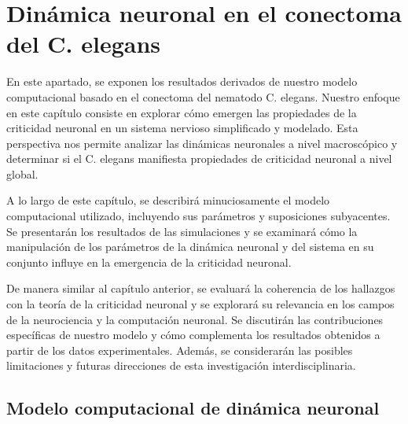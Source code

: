 \chapter{Dinámica neuronal en el conectoma del C. elegans}\label{cap:resultado_critico_modelo}
\graphicspath{{figs/capitulo_resultado_critico/}}


En este apartado, se exponen los resultados derivados de nuestro modelo computacional basado en el conectoma del nematodo C. elegans. Nuestro enfoque en este capítulo consiste en explorar cómo emergen las propiedades de la criticidad neuronal en un sistema nervioso simplificado y modelado. Esta perspectiva nos permite analizar las dinámicas neuronales a nivel macroscópico y determinar si el C. elegans manifiesta propiedades de criticidad neuronal a nivel global.

A lo largo de este capítulo, se describirá minuciosamente el modelo computacional utilizado, incluyendo sus parámetros y suposiciones subyacentes. Se presentarán los resultados de las simulaciones y se examinará cómo la manipulación de los parámetros de la dinámica neuronal y del sistema en su conjunto influye en la emergencia de la criticidad neuronal.

De manera similar al capítulo anterior, se evaluará la coherencia de los hallazgos con la teoría de la criticidad neuronal y se explorará su relevancia en los campos de la neurociencia y la computación neuronal. Se discutirán las contribuciones específicas de nuestro modelo y cómo complementa los resultados obtenidos a partir de los datos experimentales. Además, se considerarán las posibles limitaciones y futuras direcciones de esta investigación interdisciplinaria.


\section{Modelo computacional de dinámica neuronal}




